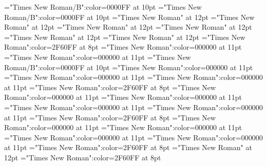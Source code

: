 \documentclass[a4paper]{article}
\begin{document}
 
\pagestyle{plain} 
\font\headwordafterentrycletDatadicBody="Times New Roman/B":color=0000FF at 10pt
\font\headwordsehentrycletDatadicBody="Times New Roman/B":color=0000FF at 10pt
\font\CmPicturepublishStemCaptionCaptionPubptpictureCaptionpictureRightNoneentrycletDatadicBody="Times New Roman" at 12pt
\font\CmPicturepublishStemCaptionSenseNumberpictureCaptionpictureRightNoneentrycletDatadicBody="Times New Roman" at 12pt
\font\pictureCaptionpictureRightNoneentrycletDatadicBody="Times New Roman" at 12pt
\font\picturepictureRightNoneentrycletDatadicBody="Times New Roman" at 12pt
\font\pictureRightNoneentrycletDatadicBody="Times New Roman" at 12pt
\font\entrycletDatadicBody="Times New Roman" at 12pt
\font\xlanguagetagendefinitionLcensensesensesentryletDatadicBody="Times New Roman":color=2F60FF at 8pt
\font{}="Times New Roman":color=000000 at 11pt
\font\xsensenumberLcensensesensesentryletDatadicBody="Times New Roman":color=000000 at 11pt
\font\xhomographnumberptheadwordsehentryletDatadicBody="Times New Roman/B":color=0000FF at 10pt
\font\sensecrossrefsehlexreftargetsxitemrelationssensesensesentryletDatadicBody="Times New Roman":color=000000 at 11pt
\font\lexreftargetsxitemrelationssensesensesentryletDatadicBody="Times New Roman":color=000000 at 11pt
\font\xitemrelationssensesensesentryletDatadicBody="Times New Roman":color=000000 at 11pt
\font\xlanguagetagentranslationpttranslationsexamplessensesensesentryletDatadicBody="Times New Roman":color=2F60FF at 8pt
\font\translationpttranslationsexamplessensesensesentryletDatadicBody="Times New Roman":color=000000 at 11pt
\font\translationsexamplessensesensesentryletDatadicBody="Times New Roman":color=000000 at 11pt
\font\examplesehexamplessensesensesentryletDatadicBody="Times New Roman":color=000000 at 11pt
\font\examplessensesensesentryletDatadicBody="Times New Roman":color=000000 at 11pt
\font\xlanguagetagendefinitionptsensesensesentryletDatadicBody="Times New Roman":color=2F60FF at 8pt
\font{}="Times New Roman":color=000000 at 11pt
\font\sensecrossrefsehlexreftargetsrelationssensesensesentryletDatadicBody="Times New Roman":color=000000 at 11pt
\font\lexreftargetsrelationssensesensesentryletDatadicBody="Times New Roman":color=000000 at 11pt
\font\relationssensesensesentryletDatadicBody="Times New Roman":color=000000 at 11pt
\font\xlanguagetagenxitemendefinitionLcptsensesensesentrybletDatadicBody="Times New Roman":color=2F60FF at 8pt
\font\xitemendefinitionLcptsensesensesentrybletDatadicBody="Times New Roman" at 12pt
\font\xlanguagetagenxitemptdefinitionLcptsensesensesentrybletDatadicBody="Times New Roman":color=2F60FF at 8pt
\end{document}
